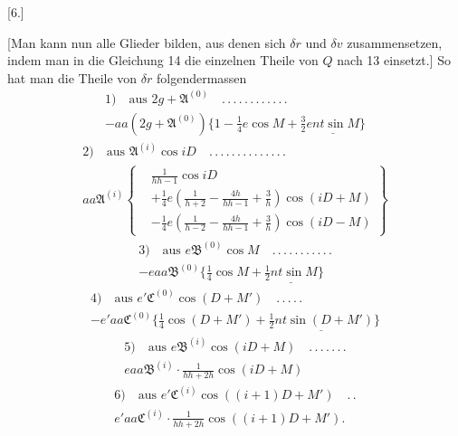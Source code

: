 \par\bigskip
\hypertarget{native-395}{}
\begin{center}[6.]\end{center}
\noindent\hspace*{\parindent}[Man kann nun alle Glieder bilden, aus denen sich \(\delta r\) und \(\delta v\) zusammensetzen, indem man in die Gleichung 14 die einzelnen Theile von \(Q\) nach 13 einsetzt.] So hat man die Theile von \(\delta r\) folgendermassen
\[
\begin{gathered}
1)\quad\text{aus }2g+\mathfrak A^{(0)}\quad .\, .\, .\, .\, .\, .\, .\, .\, .\, .\, .\, .\\[.5ex]
-aa(2g+\mathfrak A^{(0)})\{1-\tfrac14e\cos M+\underline{\tfrac32ent\sin M\}}
\end{gathered}
\]
\[
\begin{gathered}
2)\quad\text{aus }\mathfrak A^{(i)}\cos iD\quad .\, .\, .\, .\, .\, .\, .\, .\, .\, .\, .\, .\, .\, .\\[.5ex]
aa\mathfrak A^{(i)}\left\{\begin{aligned}
&\frac1{hh-1}\cos iD\\
&+\tfrac14e\left(\frac1{h+2}-\frac{4h}{hh-1}+\frac3h\right)\cos(iD+M)\\
&-\tfrac14e\left(\frac1{h-2}-\frac{4h}{hh-1}+\frac3h\right)\cos(iD-M)
\end{aligned}\right\}
\end{gathered}
\]
\[
\begin{gathered}
3)\quad\text{aus }e\mathfrak B^{(0)}\cos M\quad .\, .\, .\, .\, .\, .\, .\, .\, .\, .\, .\\[.5ex]
-eaa\mathfrak B^{(0)}\{\tfrac14\cos M+\underline{\tfrac12nt\sin M}\}
\end{gathered}
\]
\[
\begin{gathered}
4)\quad\text{aus }e'\mathfrak C^{(0)}\cos(D+M')\quad .\, .\, .\, .\, .\\[.5ex]
-e'aa\mathfrak C^{(0)}\{\tfrac14\cos(D+M')+\underline{\tfrac12nt\sin(D+M')}\}
\end{gathered}
\]
\[
\begin{gathered}
5)\quad\text{aus }e\mathfrak B^{(i)}\cos(iD+M)\quad .\, .\, .\, .\, .\, .\, .\\[.5ex]
eaa\mathfrak B^{(i)}\cdot\frac1{hh+2h}\cos(iD+M)
\end{gathered}
\]
\[
\begin{gathered}
6)\quad\text{aus }e'\mathfrak C^{(i)}\cos((i+1)D+M')\quad .\, .\\[.5ex]
e'aa\mathfrak C^{(i)}\cdot\frac1{hh+2h}\cos((i+1)D+M').
\end{gathered}
\]


